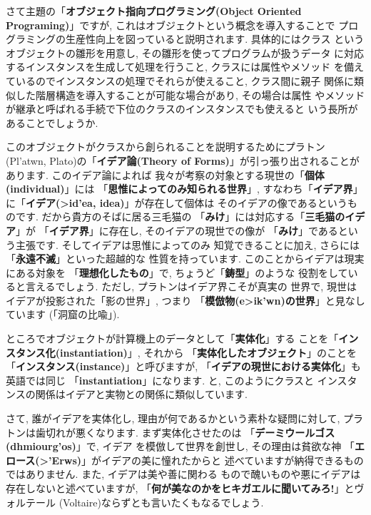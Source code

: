 \documentclass[b5j,8pt,twocolumn]{ltjsarticle}
\newcommand{\textgreek}[1]{\begingroup\fontencoding{LGR}\selectfont#1\endgroup}
\begin{document}
さて主題の「\textbf{オブジェクト指向プログラミング(Object Oriented
 Programing)}」ですが, これはオブジェクトという概念を導入することで
プログラミングの生産性向上を図っていると説明されます. 具体的にはクラス
というオブジェクトの雛形を用意し, その雛形を使ってプログラムが扱うデータ
に対応するインスタンスを生成して処理を行うこと, クラスには属性やメソッド
を備えているのでインスタンスの処理でそれらが使えること, クラス間に親子
関係に類似した階層構造を導入することが可能な場合があり, その場合は属性
やメソッドが継承と呼ばれる手続で下位のクラスのインスタンスでも使えると
いう長所があることでしょうか.
\newline


このオブジェクトがクラスから創られることを説明するためにプラトン
(\textgreek{Pl'atwn}, Plato)の「\textbf{イデア論(Theory
 of Forms)}」が引っ張り出されることがあります. このイデア論によれば
我々が考察の対象とする現世の「\textbf{個体(individual)}」には
「\textbf{思惟によってのみ知られる世界}」, すなわち「\textbf{イデア界}」
に「\textbf{イデア(\textgreek{>id'ea}, idea)}」が存在して個体は
そのイデアの像であるというものです. だから貴方のそばに居る三毛猫の
「\textbf{みけ}」には対応する「\textbf{三毛猫のイデア}」が
「\textbf{イデア界}」に存在し, そのイデアの現世での像が
「\textbf{みけ}」であるという主張です. そしてイデアは思惟によってのみ
知覚できることに加え, さらには「\textbf{永遠不滅}」といった超越的な
性質を持っています. このことからイデアは現実にある対象を
「\textbf{理想化したもの}」で, ちょうど「\textbf{鋳型}」のような
役割をしていると言えるでしょう. ただし, プラトンはイデア界こそが真実の
世界で, 現世はイデアが投影された「影の世界」, つまり
「\textbf{模倣物(\textgreek{e>ik'wn})の世界}」と見なしています
(「洞窟の比喩」\cite{国家}).
\newline


ところでオブジェクトが計算機上のデータとして「\textbf{実体化}」する
ことを「\textbf{インスタンス化(instantiation)}」, それから
「\textbf{実体化したオブジェクト}」のことを
「\textbf{インスタンス(instance)}」と呼びますが, 
「\textbf{イデアの現世における実体化}」も英語では同じ
「\textbf{instantiation}」になります. と, このようにクラスと
インスタンスの関係はイデアと実物との関係に類似しています. 
\newline

さて, 誰がイデアを実体化し, 理由が何であるかという素朴な疑問に対して,
 プラトンは歯切れが悪くなります. まず実体化させたのは
 「\textbf{デーミウールゴス(\textgreek{dhmiourg'os})}」で, イデア
を模倣して世界を創世し, その理由は貧欲な神
「\textbf{エロース(\textgreek{>'Erws})}」がイデアの美に憧れたからと
述べていますが納得できるものではありません. また, イデアは美や善に関わる
もので醜いものや悪にイデアは存在しないと述べていますが,
 「\textbf{何が美なのかをヒキガエルに聞いてみろ!}」とヴォルテール
(Voltaire)ならずとも言いたくもなるでしょう.
\newline
\end{document}
